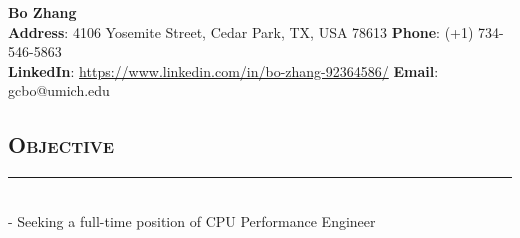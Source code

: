 \documentclass[12pt]{res}
\newcommand{\style}[1]{\color{Blue}\large\textsc{#1}}
\begin{document}
\begin{center}
\vspace{-3cm}

\textbf{\LARGE Bo Zhang}\\
\vspace{-1.0mm}
\hspace{-1.35cm}
{\indent \bf Address}: 4106 Yosemite Street, Cedar Park,  TX, USA 78613 \hfill {\bf Phone}: (+1) 734-546-5863\\
\vspace{-1.2mm}
\hspace{-1.35cm}
{\indent \bf LinkedIn}: {\color{Blue}\url{https://www.linkedin.com/in/bo-zhang-92364586/}} \hfill {\bf Email}: gcbo@umich.edu\\
\end{center}


\begin{resume}


\vspace{-35pt}
\section{\style{Objective}}
\vspace{-10pt}
\rule{18cm}{0.5mm}\\
 -\sectionwidth \resumewidth
Seeking a full-time position of CPU Performance Engineer%
\vspace{-25pt}\\


\end{resume}
\end{document}
